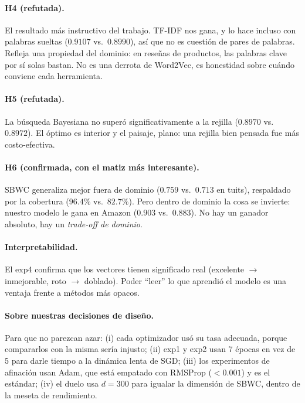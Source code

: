 \documentclass[11pt]{article}
\begin{document}
\paragraph{H4 (refutada).} El resultado más instructivo del trabajo. TF-IDF nos gana, y lo
hace incluso con palabras sueltas ($0.9107$ vs.\ $0.8990$), así que no es cuestión de pares de
palabras. Refleja una propiedad del dominio: en reseñas de productos, las palabras clave por sí
solas bastan. No es una derrota de Word2Vec, es honestidad sobre cuándo conviene cada
herramienta.

\paragraph{H5 (refutada).} La búsqueda Bayesiana no superó significativamente a la rejilla
($0.8970$ vs.\ $0.8972$). El óptimo es interior y el paisaje, plano: una rejilla bien pensada
fue más costo-efectiva.

\paragraph{H6 (confirmada, con el matiz más interesante).} SBWC generaliza mejor fuera de
dominio ($0.759$ vs.\ $0.713$ en tuits), respaldado por la cobertura ($96.4\%$ vs.\ $82.7\%$).
Pero dentro de dominio la cosa se invierte: nuestro modelo le gana en Amazon ($0.903$ vs.\
$0.883$). No hay un ganador absoluto, hay un \emph{trade-off de dominio}.

\paragraph{Interpretabilidad.} El exp4 confirma que los vectores tienen significado real
(excelente $\to$ inmejorable, roto $\to$ doblado). Poder ``leer'' lo que aprendió el modelo es
una ventaja frente a métodos más opacos.

\paragraph{Sobre nuestras decisiones de diseño.} Para que no parezcan azar: (i) cada
optimizador usó su tasa adecuada, porque compararlos con la misma sería injusto; (ii) exp1 y
exp2 usan 7 épocas en vez de 5 para darle tiempo a la dinámica lenta de SGD; (iii) los
experimentos de afinación usan Adam, que está empatado con RMSProp ($<0.001$) y es el estándar;
(iv) el duelo usa $d=300$ para igualar la dimensión de SBWC, dentro de la meseta de rendimiento.
\end{document}
